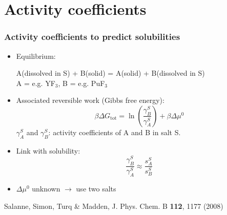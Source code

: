 \documentclass{beamer}
\begin{document}
\section{Activity coefficients}
\begin{frame}
    \frametitle{Activity coefficients to predict solubilities}
    \begin{itemize}
        \item Equilibrium:
            \begin{center}
                A(dissolved in S) + B(solid) = A(solid) + B(dissolved in S)\\
                A = e.g. YF$_3$, B = e.g. PuF$_3$
            \end{center}
        \item Associated reversible work (Gibbs free energy):
            \begin{equation}
                \beta \Delta G_\text{tot} = \ln\left(\frac{\gamma_B^S}{\gamma_A^S}\right) +\beta \Delta \mu ^0 \nonumber
            \end{equation}
            $\gamma_A^S$ and $\gamma_B^S$: activity coefficients of A and B in salt S.
        \item Link with solubility:
            \begin{equation}
                \frac{\gamma_B^S}{\gamma_A^S} \approx \frac{s_A^S}{s_B^S}   \nonumber
            \end{equation}
        \item $\Delta\mu^0$ unknown $\rightarrow$ use two salts
    \end{itemize}
    \scriptsize{Salanne, Simon, Turq \& Madden, J. Phys. Chem. B \textbf{112}, 1177 (2008)}
\end{frame}
\end{document}
